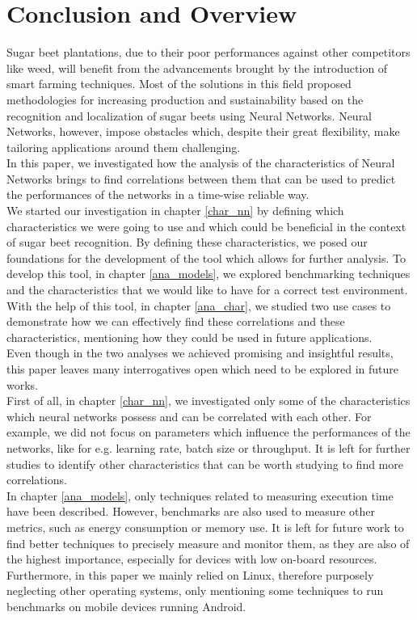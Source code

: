 \chapter{Conclusion and Overview}

Sugar beet plantations, due to their poor performances against other competitors like weed, will benefit from the advancements brought by the introduction of smart farming techniques. Most of the solutions in this field proposed methodologies for increasing production and sustainability based on the recognition and localization of sugar beets using Neural Networks. Neural Networks, however, impose obstacles which, despite their great flexibility, make tailoring applications around them challenging.\\ 
In this paper, we investigated how the analysis of the characteristics of Neural Networks brings to find correlations between them that can be used to predict the performances of the networks in a time-wise reliable way.\\
We started our investigation in chapter \ref{char_nn} by defining which characteristics we were going to use and which could be beneficial in the context of sugar beet recognition. By defining these characteristics, we posed our foundations for the development of the tool which allows for further analysis. To develop this tool, in chapter \ref{ana_models}, we explored benchmarking techniques and the characteristics that we would like to have for a correct test environment. With the help of this tool, in chapter \ref{ana_char},  we studied two use cases to demonstrate how we can effectively find these correlations and these characteristics, mentioning how they could be used in future applications. \\
Even though in the two analyses we achieved promising and insightful results, this paper leaves many interrogatives open which need to be explored in future works. \\
First of all, in chapter \ref{char_nn}, we investigated only some of the characteristics which neural networks possess and can be correlated with each other. For example, we did not focus on parameters which influence the performances of the networks, like for e.g. learning rate, batch size or throughput. It is left for further studies to identify other characteristics that can be worth studying to find more correlations.\\
In chapter \ref{ana_models}, only techniques related to measuring execution time have been described. However, benchmarks are also used to measure other metrics, such as energy consumption or memory use. It is left for future work to find better techniques to precisely measure and monitor them, as they are also of the highest importance, especially for devices with low on-board resources. Furthermore, in this paper we mainly relied on Linux, therefore purposely neglecting other operating systems, only mentioning some techniques to run benchmarks on mobile devices running Android. %

